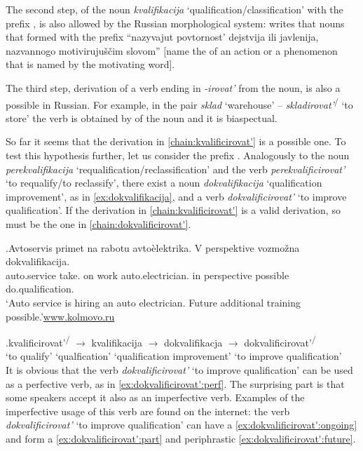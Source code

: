 The second step,  of the noun \textit{kvalifikacija} `qualification\slash classifica\-tion' with the prefix , is also allowed by the Russian morphological system: \citet[226]{Shvedova:82} writes that nouns that formed with the prefix  ``nazyvajut povtornost' dejstvija ili javlenija, nazvannogo motiviruju\v{s}\v{c}im slovom'' [name the  of an action or a phenomenon that is named by the motivating word].

The third step, derivation of a verb ending in \textit{-irovat'} from the noun, is also a possible  in Russian. For example, in the pair \textit{sklad} `warehouse' -- \textit{skladirovat'}\textsuperscript{\PF\slash\IPF} `to store' the verb is obtained by  of the noun and it is biaspectual.

So far it seems that the derivation in \ref{chain:kvalificirovat'} is a possible one. To test this hypothesis further, let us consider the  prefix . Analogously to the noun \textit{perekvalifikacija} `requalification/reclassification' and the verb \textit{perekvalificirovat'} `to requalify/to reclassify', there exist a noun \textit{dokvalifikacija} `qualification improvement', as in \ref{ex:dokvalifikacija}, and a verb \textit{dokvalificirovat'} `to improve qualification'. If the derivation in \ref{chain:kvalificirovat'} is a valid derivation, so must be the one in \ref{chain:dokvalificirovat'}.

\exg.\label{ex:dokvalifikacija}Avtoservis primet na rabotu avto\`{e}lektrika. V perspektive vozmo\v{z}na dokvalifikacija.\\
{auto.service} take. on work {auto.electrician.} in perspective possible do.qualification.\\
\trans `Auto service is hiring an auto electrician. Future additional training possible.'\hbox{}\hfill\hbox{\url{www.kolmovo.ru}}

\exg.\label{chain:dokvalificirovat'}kvalificirovat'\textsuperscript{\PF\slash\IPF} {$\rightarrow$} kvalifikacija {$\rightarrow$} dokvalifikacja {$\rightarrow$} dokvalificirovat'\textsuperscript{\PF\slash\IPF}\\
{`to qualify'} {} {`qualfication'} {} {`qualification improvement'} {} {`to improve qualification'}\\

It is obvious that the verb \textit{dokvalificirovat'} `to improve qualification' can be used as a perfective verb, as in \ref{ex:dokvalificirovat':perf}. The surprising part is that some speakers accept it also as an imperfective verb. Examples of the imperfective usage of this verb are found on the internet: the verb \textit{dokvalificirovat'} `to improve qualification' can have a  \ref{ex:dokvalificirovat':ongoing} and form a  \ref{ex:dokvalificirovat':part} and periphrastic  \ref{ex:dokvalificirovat':future}. 

